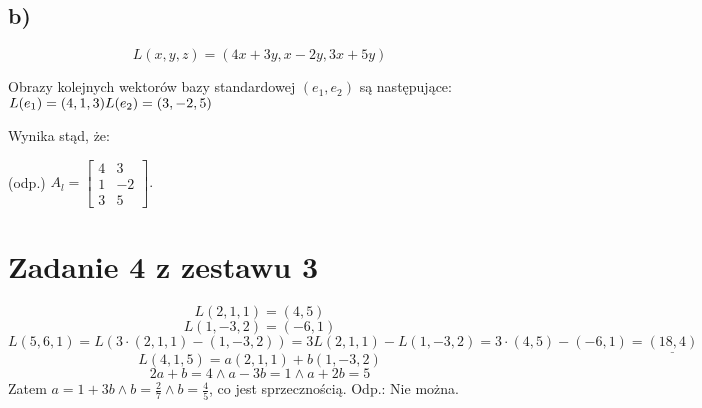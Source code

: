 \documentclass{article}
\begin{document}
\subsection{b)}

$$L(x,y,z) = (4x+3y, x-2y, 3x+5y)$$ 

Obrazy kolejnych wektorów bazy standardowej $(e_{1}, e_{2}) $ są następujące: \newline
$ \\
 L(e_{1}) = (4, 1, 3) \\
 L(e_{2}) = (3, -2, 5) $ \newline
 
 Wynika stąd, że: \newline
 
 (odp.) $A_{l} = \left[\begin{array}{cc}
4 & 3 \\
1 & -2 \\
3 & 5 \end{array}\right].$ \newline

\section{Zadanie 4 z zestawu 3}
$$L(2,1,1) = (4,5) $$
$$L(1,-3,2) = (-6,1)$$\newline
$L(5,6,1) = L(3 \cdot (2,1,1) - (1,-3,2)) = 3L(2,1,1)-L(1,-3,2) = 3 \cdot (4,5) - (-6,1) = \underline{(18,4)} $\newline
$$L(4,1,5) = a(2,1,1)+b(1,-3,2)$$
$$2a+b = 4 \wedge a-3b = 1 \wedge a+2b=5$$
Zatem $a=1+3b \wedge b= \frac{2}{7} \wedge b=\frac{4}{5}$, co jest sprzecznością. Odp.: Nie można.
\end{document}
